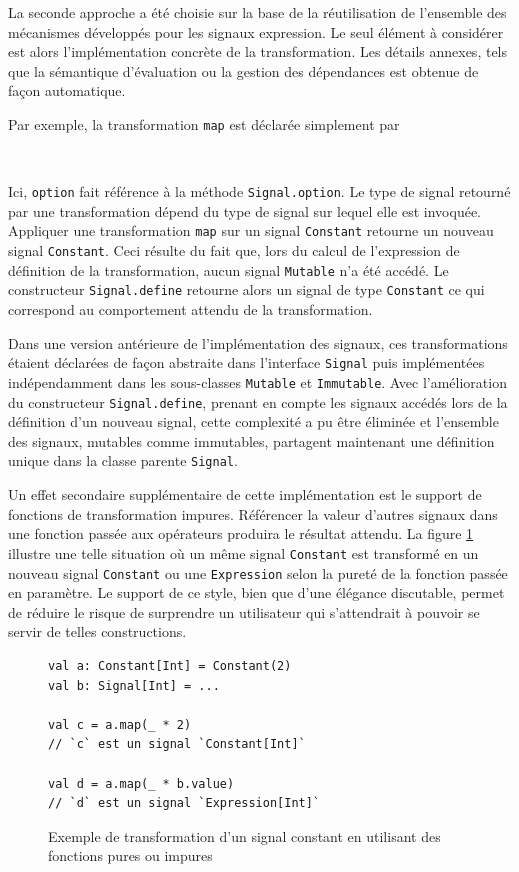 La seconde approche a été choisie sur la base de la réutilisation de l'ensemble des mécanismes développés pour les signaux expression. Le seul élément à considérer est alors l'implémentation concrète de la transformation. Les détails annexes, tels que la sémantique d'évaluation ou la gestion des dépendances est obtenue de façon automatique.

Par exemple, la transformation \texttt{map} est déclarée simplement par
\begin{center}
	\\
\end{center}
Ici, \texttt{option} fait référence à la méthode \texttt{Signal.option}. Le type de signal retourné par une transformation dépend du type de signal sur lequel elle est invoquée. Appliquer une transformation \texttt{map} sur un signal \texttt{Constant} retourne un nouveau signal \texttt{Constant}. Ceci résulte du fait que, lors du calcul de l'expression de définition de la transformation, aucun signal \texttt{Mutable} n'a été accédé. Le constructeur \texttt{Signal.define} retourne alors un signal de type \texttt{Constant} ce qui correspond au comportement attendu de la transformation.

Dans une version antérieure de l'implémentation des signaux, ces transformations étaient déclarées de façon abstraite dans l'interface \texttt{Signal} puis implémentées indépendamment dans les sous-classes \texttt{Mutable} et \texttt{Immutable}. Avec l'amélioration du constructeur \texttt{Signal.define}, prenant en compte les signaux accédés lors de la définition d'un nouveau signal, cette complexité a pu être éliminée et l'ensemble des signaux, mutables comme immutables, partagent maintenant une définition unique dans la classe parente \texttt{Signal}.

Un effet secondaire supplémentaire de cette implémentation est le support de fonctions de transformation impures. Référencer la valeur d'autres signaux dans une fonction passée aux opérateurs produira le résultat attendu. La figure \ref{fig:sig-map-pureness} illustre une telle situation où un même signal \texttt{Constant} est transformé en un nouveau signal \texttt{Constant} ou une \texttt{Expression} selon la pureté de la fonction passée en paramètre. Le support de ce style, bien que d'une élégance discutable, permet de réduire le risque de surprendre un utilisateur qui s'attendrait à pouvoir se servir de telles constructions.

\begin{figure}
	\begin{lstlisting}
val a: Constant[Int] = Constant(2)
val b: Signal[Int] = ...

val c = a.map(_ * 2)
// `c` est un signal `Constant[Int]`

val d = a.map(_ * b.value)
// `d` est un signal `Expression[Int]`
	\end{lstlisting}
	\caption{Exemple de transformation d'un signal constant en utilisant des fonctions pures ou impures}
	\label{fig:sig-map-pureness}
\end{figure}

